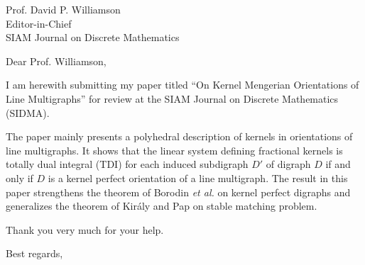 \documentclass[10pt]{letter}
\begin{document}
\begin{letter}{Prof. David P. Williamson\\
Editor-in-Chief \\
SIAM Journal on Discrete Mathematics}


\opening{Dear Prof. Williamson,}
I am herewith submitting my paper titled ``On Kernel Mengerian Orientations of Line Multigraphs'' for review at the SIAM Journal on Discrete Mathematics (SIDMA). 

The paper mainly presents a polyhedral description of kernels in orientations of line multigraphs. It shows that the linear system defining fractional kernels is totally dual integral (TDI) for each induced subdigraph $D'$ of digraph $D$ if and only if $D$ is a kernel perfect orientation of a line multigraph. The result in this paper strengthens the theorem of Borodin \textit{et al.} on kernel perfect digraphs and generalizes the theorem of Kir\'{a}ly and Pap on stable matching problem.




Thank you very much for your help.

\closing{Best regards,}
\end{letter}
\end{document}
